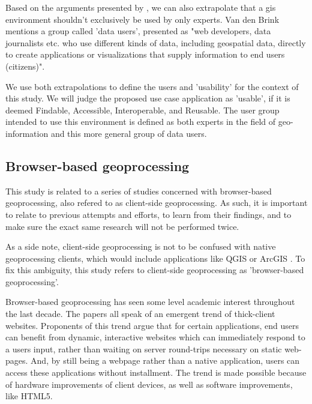Based on the arguments presented by \cite{brink_geospatial_2018}, we can also extrapolate that a \ac{gis} environment shouldn't exclusively be used by only experts. Van den Brink mentions a group called 'data users', presented as "web developers, data journalists etc. who use different kinds of data, including geospatial data, directly to create applications or visualizations that supply information to end users (citizens)". 

We use both extrapolations to define the users and 'usability' for the context of this study. We will judge the proposed use case application as 'usable', if it is deemed Findable, Accessible, Interoperable, and Reusable. The user group intended to use this environment is defined as both experts in the field of geo-information and this more general group of data users.

\subsection{Browser-based geoprocessing}


This study is related to a series of studies concerned with browser-based geoprocessing, also refered to as client-side geoprocessing. As such, it is important to relate to previous attempts and efforts, to learn from their findings, and to make sure the exact same research will not be performed twice. 

As a side note, client-side geoprocessing is not to be confused with native geoprocessing clients, which would include applications like QGIS \cite{qgis_community_qgis_2022}or ArcGIS \cite{esri_arcgis_2022}.
To fix this ambiguity, this study refers to client-side geoprocessing as 'browser-based geoprocessing'.

Browser-based geoprocessing has seen some level academic interest throughout the last decade. The papers \cite{hamilton_client-side_2014, panidi_hybrid_2015, kulawiak_analysis_2019} all speak of an emergent trend of thick-client websites. 
Proponents of this trend argue that for certain applications, end users can benefit from dynamic, interactive websites which can immediately respond to a users input, rather than waiting on server round-trips necessary on static web-pages. 
And, by still being a webpage rather than a native application, users can access these applications without installment. 
The trend is made possible because of hardware improvements of client devices, as well as software improvements, like HTML5.

